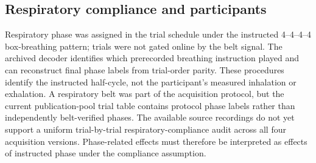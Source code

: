 \subsection{Respiratory compliance and participants}

Respiratory phase was assigned in the trial schedule under the instructed 4--4--4--4 box-breathing pattern; trials were not gated online by the belt signal. The archived decoder identifies which prerecorded breathing instruction played and can reconstruct final phase labels from trial-order parity. These procedures identify the instructed half-cycle, not the participant's measured inhalation or exhalation. A respiratory belt was part of the acquisition protocol, but the current publication-pool trial table contains protocol phase labels rather than independently belt-verified phases. The available source recordings do not yet support a uniform trial-by-trial respiratory-compliance audit across all four acquisition versions. Phase-related effects must therefore be interpreted as effects of instructed phase under the compliance assumption.

